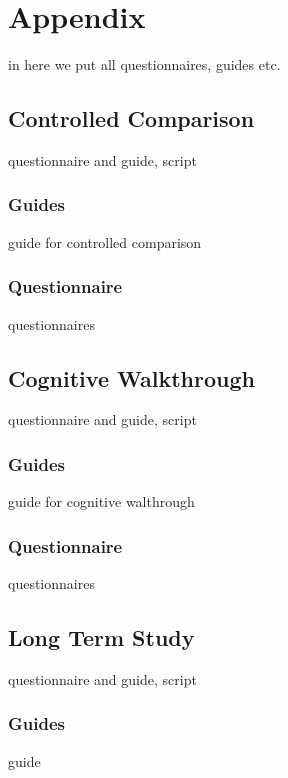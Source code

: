 
\chapter{Appendix}

in here we put all questionnaires, guides etc.

\section{Controlled Comparison}

questionnaire and guide, script

\subsection{Guides}

guide for controlled comparison

\subsection{Questionnaire}

questionnaires

\section{Cognitive Walkthrough}

questionnaire and guide, script

\subsection{Guides}

guide for cognitive walthrough

\subsection{Questionnaire}

questionnaires

\section{Long Term Study}

questionnaire and guide, script

\subsection{Guides}

guide